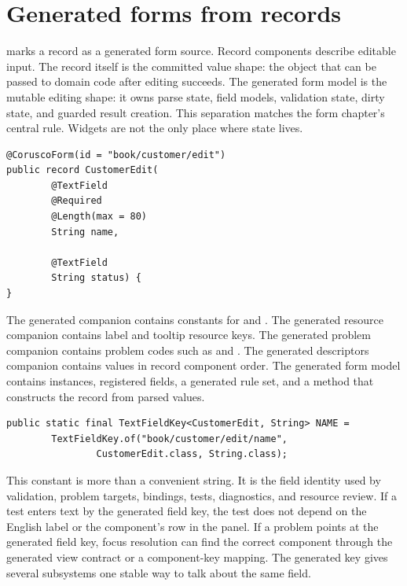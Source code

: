 \section{Generated forms from records}

 marks a record as a generated form source. Record components
describe editable input. The record itself is the committed value shape: the
object that can be passed to domain code after editing succeeds. The generated
form model is the mutable editing shape: it owns parse state, field models,
validation state, dirty state, and guarded result creation. This separation
matches the form chapter's central rule. Widgets are not the only place where
state lives.

\begin{lstlisting}[caption={Annotated form source used by the companion example.}]
@CoruscoForm(id = "book/customer/edit")
public record CustomerEdit(
        @TextField
        @Required
        @Length(max = 80)
        String name,

        @TextField
        String status) {
}
\end{lstlisting}

The generated  companion contains
 constants for  and
. The generated resource companion contains label and tooltip
resource keys. The generated problem companion contains problem codes such as
 and
. The generated descriptors companion
contains  values in record component order. The generated
form model contains  instances, registered fields, a
generated rule set, and a  method that constructs the record
from parsed values.

\begin{lstlisting}[caption={A generated field key has stable id, owner type, and value type.}]
public static final TextFieldKey<CustomerEdit, String> NAME =
        TextFieldKey.of("book/customer/edit/name",
                CustomerEdit.class, String.class);
\end{lstlisting}

This constant is more than a convenient string. It is the field identity used
by validation, problem targets, bindings, tests, diagnostics, and resource
review. If a test enters text by the generated field key, the test does not
depend on the English label or the component's row in the panel. If a problem
points at the generated field key, focus resolution can find the correct
component through the generated view contract or a component-key mapping. The
generated key gives several subsystems one stable way to talk about the same
field.

